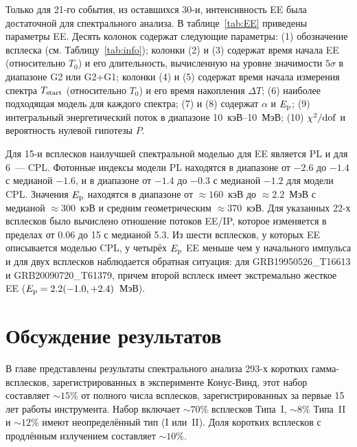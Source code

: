 Только для 21-го события, из оставшихся 30-и, интенсивность EE была достаточной для спектрального анализа.
В таблице~\ref{tab:EE} приведены параметры EE. Десять колонок содержат следующие параметры:
(1) обозначение всплеска (см. Таблицу~\ref{tab:info});
колонки (2) и (3) содержат время начала EE (относительно $T_0$) и его длительность, 
вычисленную на уровне значимости $5\sigma$ в диапазоне G2 или G2+G1;
колонки (4) и (5) содержат время начала измерения спектра $T_{\mathrm{start}}$ (относительно $T_0$) 
и его время накопления $\Delta T$;
(6) наиболее подходящая модель для каждого спектра;
(7) и (8) содержат $\alpha$ и $E_{\mathrm{p}}$;
(9) интегральный энергетический поток в диапазоне 10~кэВ--10~МэВ; 
(10) $\chi^2/{\mathrm{dof}}$ и вероятность нулевой гипотезы $P$.

Для 15-и всплесков наилучшей спектральной моделью для EE является PL и для 6~--- CPL.   
Фотонные индексы модели PL находятся в диапазоне от $-2.6$ до $-1.4$ с медианой $-1.6$,
и в диапазоне от $-1.4$ до $-0.3$ с медианой $-1.2$ для модели CPL.
Значения $E_{\mathrm{p}}$ находятся в диапазоне от $\approx160$~кэВ до $\approx 2.2$~МэВ с медианой $\approx300$~кэВ
и средним геометрическим $\approx370$~кэВ. 
Для указанных 22-х всплесков было вычислено отношение потоков EE/IP, 
которое изменяется в пределах от 0.06 до 15 с медианой 5.3. 
Из шести всплесков, у которых EE описывается моделью CPL, у четырёх $E_{\mathrm{p}}$ EE 
меньше чем у начального импульса и для двух всплесков наблюдается обратная ситуация:
для GRB19950526\_T16613 и GRB20090720\_T61379, причем второй всплеск имеет экстремально
жесткое EE ($E_{\mathrm{p}} = 2.2(-1.0,+2.4)$~МэВ).

\section{Обсуждение результатов}\label{sec:SUMMARY}
В главе представлены результаты спектрального анализа 293-х коротких гамма-всплесков,
зарегистрированных в эксперименте Конус-Винд, этот набор составляет $\sim 15$\% 
от полного числа всплесков, зарегистрированных за первые 15 лет работы инструмента.
Набор включает $\sim 70$\% всплесков Типа~I, $\sim 8$\% Типа~II и $\sim 12$\%
имеют неопределённый тип (I или~II). Доля коротких всплесков с продлённым 
излучением составляет $\sim 10$\%.

